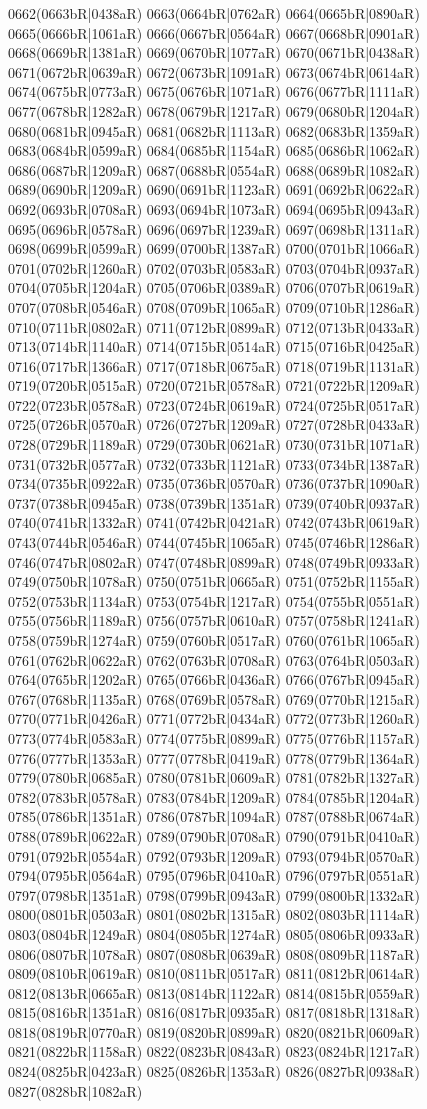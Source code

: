0662(0663bR|0438aR) 0663(0664bR|0762aR) 0664(0665bR|0890aR) 0665(0666bR|1061aR) 0666(0667bR|0564aR) 0667(0668bR|0901aR) 0668(0669bR|1381aR) 0669(0670bR|1077aR) 0670(0671bR|0438aR) 0671(0672bR|0639aR) 0672(0673bR|1091aR) 0673(0674bR|0614aR) 0674(0675bR|0773aR) 0675(0676bR|1071aR) 0676(0677bR|1111aR) 0677(0678bR|1282aR) 0678(0679bR|1217aR) 0679(0680bR|1204aR) 0680(0681bR|0945aR) 0681(0682bR|1113aR) 0682(0683bR|1359aR) 0683(0684bR|0599aR) 0684(0685bR|1154aR) 0685(0686bR|1062aR) 0686(0687bR|1209aR) 0687(0688bR|0554aR) 0688(0689bR|1082aR) 0689(0690bR|1209aR) 0690(0691bR|1123aR) 0691(0692bR|0622aR) 0692(0693bR|0708aR) 0693(0694bR|1073aR) 0694(0695bR|0943aR) 0695(0696bR|0578aR) 0696(0697bR|1239aR) 0697(0698bR|1311aR) 0698(0699bR|0599aR) 0699(0700bR|1387aR) 0700(0701bR|1066aR) 0701(0702bR|1260aR) 0702(0703bR|0583aR) 0703(0704bR|0937aR) 0704(0705bR|1204aR) 0705(0706bR|0389aR) 0706(0707bR|0619aR) 0707(0708bR|0546aR) 0708(0709bR|1065aR) 0709(0710bR|1286aR) 0710(0711bR|0802aR) 0711(0712bR|0899aR) 0712(0713bR|0433aR) 0713(0714bR|1140aR) 0714(0715bR|0514aR) 0715(0716bR|0425aR) 0716(0717bR|1366aR) 0717(0718bR|0675aR) 0718(0719bR|1131aR) 0719(0720bR|0515aR) 0720(0721bR|0578aR) 0721(0722bR|1209aR) 0722(0723bR|0578aR) 0723(0724bR|0619aR) 0724(0725bR|0517aR) 0725(0726bR|0570aR) 0726(0727bR|1209aR) 0727(0728bR|0433aR) 0728(0729bR|1189aR) 0729(0730bR|0621aR) 0730(0731bR|1071aR) 0731(0732bR|0577aR) 0732(0733bR|1121aR) 0733(0734bR|1387aR) 0734(0735bR|0922aR) 0735(0736bR|0570aR) 0736(0737bR|1090aR) 0737(0738bR|0945aR) 0738(0739bR|1351aR) 0739(0740bR|0937aR) 0740(0741bR|1332aR) 0741(0742bR|0421aR) 0742(0743bR|0619aR) 0743(0744bR|0546aR) 0744(0745bR|1065aR) 0745(0746bR|1286aR) 0746(0747bR|0802aR) 0747(0748bR|0899aR) 0748(0749bR|0933aR) 0749(0750bR|1078aR) 0750(0751bR|0665aR) 0751(0752bR|1155aR) 0752(0753bR|1134aR) 0753(0754bR|1217aR) 0754(0755bR|0551aR) 0755(0756bR|1189aR) 0756(0757bR|0610aR) 0757(0758bR|1241aR) 0758(0759bR|1274aR) 0759(0760bR|0517aR) 0760(0761bR|1065aR) 0761(0762bR|0622aR) 0762(0763bR|0708aR) 0763(0764bR|0503aR) 0764(0765bR|1202aR) 0765(0766bR|0436aR) 0766(0767bR|0945aR) 0767(0768bR|1135aR) 0768(0769bR|0578aR) 0769(0770bR|1215aR) 0770(0771bR|0426aR) 0771(0772bR|0434aR) 0772(0773bR|1260aR) 0773(0774bR|0583aR) 0774(0775bR|0899aR) 0775(0776bR|1157aR) 0776(0777bR|1353aR) 0777(0778bR|0419aR) 0778(0779bR|1364aR) 0779(0780bR|0685aR) 0780(0781bR|0609aR) 0781(0782bR|1327aR) 0782(0783bR|0578aR) 0783(0784bR|1209aR) 0784(0785bR|1204aR) 0785(0786bR|1351aR) 0786(0787bR|1094aR) 0787(0788bR|0674aR) 0788(0789bR|0622aR) 0789(0790bR|0708aR) 0790(0791bR|0410aR) 0791(0792bR|0554aR) 0792(0793bR|1209aR) 0793(0794bR|0570aR) 0794(0795bR|0564aR) 0795(0796bR|0410aR) 0796(0797bR|0551aR) 0797(0798bR|1351aR) 0798(0799bR|0943aR) 0799(0800bR|1332aR) 0800(0801bR|0503aR) 0801(0802bR|1315aR) 0802(0803bR|1114aR) 0803(0804bR|1249aR) 0804(0805bR|1274aR) 0805(0806bR|0933aR) 0806(0807bR|1078aR) 0807(0808bR|0639aR) 0808(0809bR|1187aR) 0809(0810bR|0619aR) 0810(0811bR|0517aR) 0811(0812bR|0614aR) 0812(0813bR|0665aR) 0813(0814bR|1122aR) 0814(0815bR|0559aR) 0815(0816bR|1351aR) 0816(0817bR|0935aR) 0817(0818bR|1318aR) 0818(0819bR|0770aR) 0819(0820bR|0899aR) 0820(0821bR|0609aR) 0821(0822bR|1158aR) 0822(0823bR|0843aR) 0823(0824bR|1217aR) 0824(0825bR|0423aR) 0825(0826bR|1353aR) 0826(0827bR|0938aR) 0827(0828bR|1082aR) 